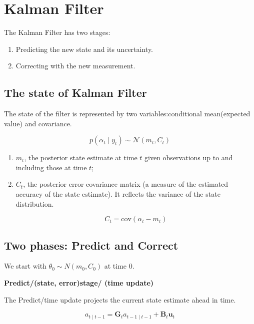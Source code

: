 \section{Kalman Filter} 

The Kalman Filter has two stages: 

\begin{enumerate}
	\item{Predicting the new state and its uncertainty.}
	\item{Correcting with the new measurement.}
\end{enumerate}





\subsection{The state of Kalman Filter}

The state of the filter is represented by two variables:conditional mean(expected value) and covariance.

$$p(\alpha_t \mid y_t) \sim  \mathcal N( m_t, C_{t})$$ 

\begin{enumerate}
	\item{$m_t$, the  posterior state estimate at time $t$ given observations up to  and including those at time $t$;}
	
	
	\item{$C_{t}$, the posterior error covariance matrix (a measure of the estimated accuracy of the state estimate). It reflects the variance of the state distribution.
		
		$$C_{t} = \mathrm{cov}(\alpha_t - m_t)$$
		
					
		}
	
\end{enumerate}




\subsection{Two phases: Predict and Correct} 


We start  with $\theta_0 \sim N(m_0, C_0)$ at time $0$.


\textbf{Predict/(state, error)stage/ (time update)} 


The Predict/time update projects the current state estimate ahead in time. 

$${a}_{t\mid t-1} = \mathbf{G}_{t}{a}_{t-1\mid t-1} + \mathbf{B}_{t} \mathbf{u}_{t}$$



